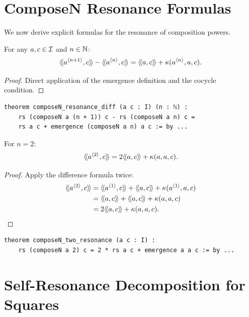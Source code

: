 \section{ComposeN Resonance Formulas}

We now derive explicit formulas for the resonance of composition powers.

\begin{theorem}
\label{thm:composeN-resonance-diff}
For any $a, c \in \mathcal{I}$ and $n \in \mathbb{N}$:
\[
  \langle\!\langle a^{\langle n+1 \rangle}, c \rangle\!\rangle - \langle\!\langle a^{\langle n \rangle}, c \rangle\!\rangle = \langle\!\langle a, c \rangle\!\rangle + \kappa(a^{\langle n \rangle}, a, c).
\]
\end{theorem}

\begin{proof}
Direct application of the emergence definition and the cocycle condition.
\end{proof}

\begin{lstlisting}[caption={ComposeN resonance diff (IDT\_v3\_Emergence.lean)}]
theorem composeN_resonance_diff (a c : I) (n : ℕ) :
    rs (composeN a (n + 1)) c - rs (composeN a n) c =
    rs a c + emergence (composeN a n) a c := by ...
\end{lstlisting}

\begin{theorem}
\label{thm:composeN-two-resonance}
For $n = 2$:
\[
  \langle\!\langle a^{\langle 2 \rangle}, c \rangle\!\rangle = 2\langle\!\langle a, c \rangle\!\rangle + \kappa(a, a, c).
\]
\end{theorem}

\begin{proof}
Apply the difference formula twice:
\begin{align*}
\rs{\compN{a}{2}}{c} &= \rs{\compN{a}{1}}{c} + \rs{a}{c} + \emerge(\compN{a}{1}, a, c) \\
&= \rs{a}{c} + \rs{a}{c} + \emerge(a, a, c) \\
&= 2\rs{a}{c} + \emerge(a, a, c).
\end{align*}
\end{proof}

\begin{lstlisting}[caption={Two-step formula (IDT\_v3\_Emergence.lean)}]
theorem composeN_two_resonance (a c : I) :
    rs (composeN a 2) c = 2 * rs a c + emergence a a c := by ...
\end{lstlisting}


\section{Self-Resonance Decomposition for Squares}

